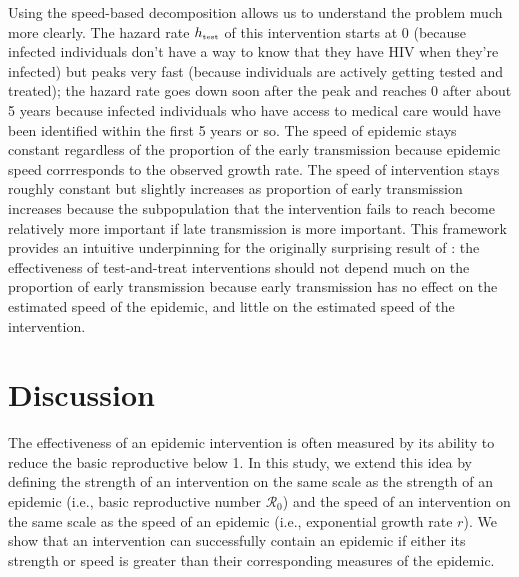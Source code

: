\documentclass[12pt]{article}
\newcommand{\tsub}[2]{#1_{{\textrm{\tiny #2}}}}
\begin{document}
Using the speed-based decomposition allows us to understand the problem much more clearly.
The hazard rate $\tsub{h}{test}$ of this intervention starts at 0 (because infected individuals don't have a way to know that they have HIV when they're infected) but peaks very fast (because individuals are actively getting tested and treated); 
the hazard rate goes down soon after the peak and reaches 0 after about 5 years because infected individuals who have access to medical care would have been identified within the first 5 years or so.
The speed of epidemic stays constant regardless of the proportion of the early transmission because epidemic speed corrresponds to the observed growth rate.
The speed of intervention stays roughly constant but slightly increases as proportion of early transmission increases because the subpopulation that the intervention fails to reach become relatively more important if late transmission is more important.
This framework provides an intuitive underpinning for the originally surprising result of \cite{eaton2014proportion}: the effectiveness of test-and-treat interventions should not depend much on the proportion of early transmission because early transmission has no effect on the estimated speed of the epidemic, and little on the estimated speed of the intervention.

\section{Discussion}

The effectiveness of an epidemic intervention is often measured by its ability to reduce the basic reproductive below 1.
In this study, we extend this idea by defining the strength of an intervention on the same scale as the strength of an epidemic (i.e., basic reproductive number $\mathcal R_0$) and the speed of an intervention on the same scale as the speed of an epidemic (i.e., exponential growth rate $r$).
We show that an intervention can successfully contain an epidemic if either its strength or speed is greater than their corresponding measures of the epidemic.
\end{document}
